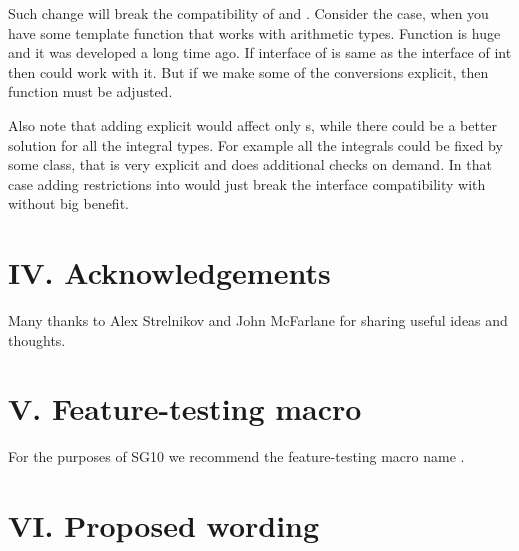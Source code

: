 \documentclass[ebook,10pt,oneside,openany,final]{memoir}
\begin{document}
Such change will break the compatibility of  and . Consider the case, when you have some template function  that works with arithmetic types. Function is huge and it was developed a long time ago. If interface of  is same as the interface of int then  could work with it. But if we make some of the conversions explicit, then  function must be adjusted.

Also note that adding explicit would affect only s, while there could be a better solution for all the integral types. For example all the integrals could be fixed by some  class, that is very explicit and does additional checks on demand. In that case adding restrictions into  would just break the interface compatibility with  without big benefit.


\section{IV. Acknowledgements}

Many thanks to Alex Strelnikov and John McFarlane for sharing useful ideas and thoughts.



\section{V. Feature-testing macro}

For the purposes of SG10 we recommend the feature-testing macro name .



\section{VI. Proposed wording}



\mainmatter
\setglobalstyles



\end{document}
